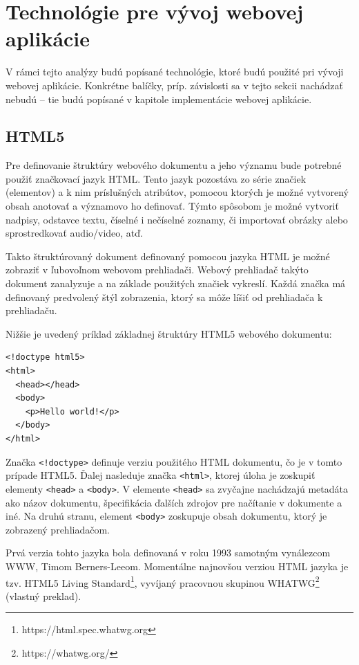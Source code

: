 \clearpage

\section {Technológie pre vývoj webovej aplikácie}
V rámci tejto analýzy budú popísané technológie, ktoré budú použité pri vývoji webovej aplikácie. Konkrétne balíčky, príp. závislosti sa v tejto sekcii nachádzať nebudú -- tie budú popísané v kapitole implementácie webovej aplikácie.

\subsection {HTML5}
Pre definovanie štruktúry webového dokumentu a jeho významu bude potrebné použiť značkovací jazyk HTML. Tento jazyk pozostáva zo série značiek (elementov) a k nim príslušných atribútov, pomocou ktorých je možné vytvorený obsah anotovať a významovo ho definovať. Týmto spôsobom je možné vytvoriť nadpisy, odstavce textu, číselné i nečíselné zoznamy, či importovať obrázky alebo sprostredkovať audio/video, atď.

Takto štruktúrovaný dokument definovaný pomocou jazyka HTML je možné zobraziť v ľubovoľnom webovom prehliadači. Webový prehliadač takýto dokument zanalyzuje a na základe použitých značiek vykreslí. Každá značka má definovaný predvolený štýl zobrazenia, ktorý sa môže líšiť od prehliadača k prehliadaču.

Nižšie je uvedený príklad základnej štruktúry HTML5 webového dokumentu:

\begin{minipage}[]{\linewidth}
\begin{verbatim}
<!doctype html5>
<html>
  <head></head>
  <body>
    <p>Hello world!</p>
  </body>
</html>
\end{verbatim}
\end{minipage}

Značka \texttt{<!doctype>} definuje verziu použitého HTML dokumentu, čo je v tomto prípade HTML5. Ďalej nasleduje značka \texttt{<html>}, ktorej úloha je zoskupiť elementy \texttt{<head>} a \texttt{<body>}. V elemente \texttt{<head>} sa zvyčajne nachádzajú metadáta ako názov dokumentu, špecifikácia ďalších zdrojov pre načítanie v dokumente a iné. Na druhú stranu, element \texttt{<body>} zoskupuje obsah dokumentu, ktorý je zobrazený prehliadačom.

Prvá verzia tohto jazyka bola definovaná v roku 1993 samotným vynálezcom WWW, Timom Berners-Leeom. Momentálne najnovšou verziou HTML jazyka je tzv. HTML5 Living Standard\footnote{https://html.spec.whatwg.org}, vyvíjaný pracovnou skupinou WHATWG\footnote{https://whatwg.org/} \cite{html_standard} (vlastný preklad).

